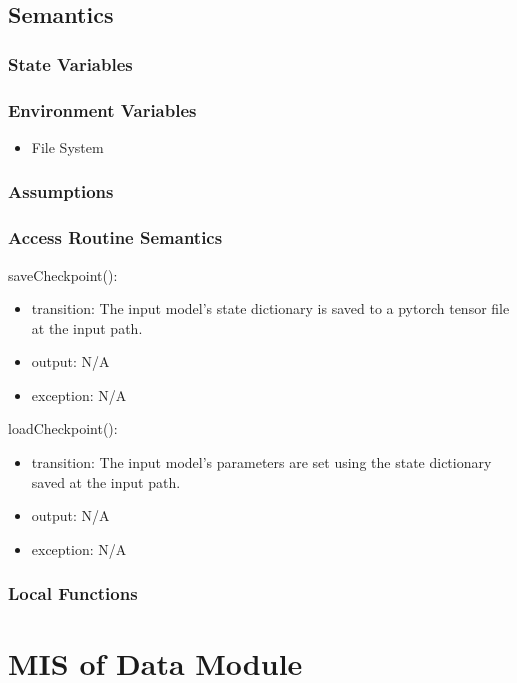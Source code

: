 \documentclass[12pt, titlepage]{article}
\begin{document}
\subsection{Semantics}

\subsubsection{State Variables}



\subsubsection{Environment Variables}

\begin{itemize}
  \item File System
\end{itemize}

\subsubsection{Assumptions}



\subsubsection{Access Routine Semantics}
\noindent saveCheckpoint():
\begin{itemize}
\item transition: The input model's state dictionary is saved to a pytorch tensor file at the input path. 
\item output: N/A
\item exception: N/A
\end{itemize}


\noindent loadCheckpoint():
\begin{itemize}
\item transition: The input model's parameters are set using the state dictionary saved at the input path.
\item output: N/A
\item exception: N/A
\end{itemize}


\subsubsection{Local Functions}

\newpage

\section{MIS of Data Module} \label{ModuleData} 
\end{document}
